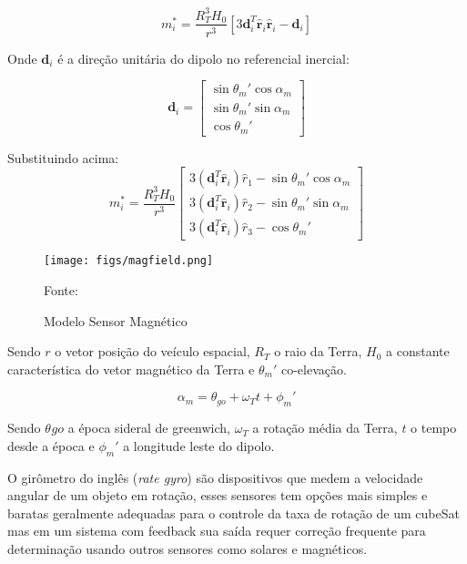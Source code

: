 \begin{equation}
m_i^* = \frac{R_T^3H_0}{r^3}\left [ 3\mathbf{d}_i^T\mathbf{\hat{r}}_i\mathbf{\hat{r}}_i-\mathbf{d}_i \right ]
\end{equation}

Onde $\mathbf{d}_i$ é a direção unitária do dipolo no referencial inercial:

\begin{equation}
\mathbf{d}_i=\begin{bmatrix} \sin\theta_m'\cos\alpha_m \\\sin\theta_m'\sin\alpha_m \\ \cos\theta_m'\end{bmatrix}
\end{equation}

Substituindo acima:
\begin{equation}
m_i^*=\frac{R_T^3H_0}{r^3}\begin{bmatrix} 3(\mathbf{d}_i^T\mathbf{\hat{r}}_i)\hat{r}_1 -\sin\theta_m'\cos\alpha_m \\ 3(\mathbf{d}_i^T\mathbf{\hat{r}}_i)\hat{r}_2-\sin\theta_m'\sin\alpha_m \\3(\mathbf{d}_i^T\mathbf{\hat{r}}_i)\hat{r}_3-\cos\theta_m'\end{bmatrix}
\end{equation}

\begin{figure}[htpb]
\centering
\texttt{[image: figs/magfield.png]}
\caption{Modelo Sensor Magnético}
{Fonte: \cite[p.~13]{mahdi2018attitude}}
\label{fig:5}
\end{figure}

Sendo $r$ o vetor posição do veículo espacial, $R_T$ o raio da Terra, $H_0$ a constante característica do vetor magnético da Terra e $\theta_m'$ co-elevação.

\begin{equation}
\alpha_m = \theta_{go}+\omega_Tt+\phi_m'
\end{equation}

Sendo $\theta_{}go$ a época sideral de greenwich, $\omega_T$ a rotação média da Terra, $t$ o tempo desde a época e $\phi_m'$ a longitude leste do dipolo.

O girômetro do inglês (\textit{rate gyro}) são dispositivos que medem a velocidade angular de um objeto em rotação, esses sensores tem opções mais simples e baratas geralmente adequadas para o controle da taxa de rotação de um cubeSat mas em um sistema com feedback sua saída requer correção frequente para determinação usando outros sensores como solares e magnéticos.


